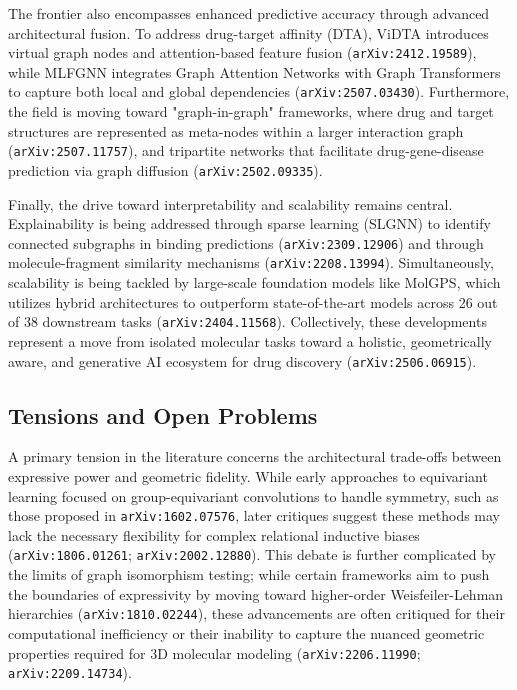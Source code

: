 \documentclass[11pt]{article}
\begin{document}
The frontier also encompasses enhanced predictive accuracy through advanced architectural fusion. To address drug-target affinity (DTA), ViDTA introduces virtual graph nodes and attention-based feature fusion (\texttt{arXiv:2412.19589}), while MLFGNN integrates Graph Attention Networks with Graph Transformers to capture both local and global dependencies (\texttt{arXiv:2507.03430}). Furthermore, the field is moving toward "graph-in-graph" frameworks, where drug and target structures are represented as meta-nodes within a larger interaction graph (\texttt{arXiv:2507.11757}), and tripartite networks that facilitate drug-gene-disease prediction via graph diffusion (\texttt{arXiv:2502.09335}).

Finally, the drive toward interpretability and scalability remains central. Explainability is being addressed through sparse learning (SLGNN) to identify connected subgraphs in binding predictions (\texttt{arXiv:2309.12906}) and through molecule-fragment similarity mechanisms (\texttt{arXiv:2208.13994}). Simultaneously, scalability is being tackled by large-scale foundation models like MolGPS, which utilizes hybrid architectures to outperform state-of-the-art models across 26 out of 38 downstream tasks (\texttt{arXiv:2404.11568}). Collectively, these developments represent a move from isolated molecular tasks toward a holistic, geometrically aware, and generative AI ecosystem for drug discovery (\texttt{arXiv:2506.06915}).

\subsection{Tensions and Open Problems}

A primary tension in the literature concerns the architectural trade-offs between expressive power and geometric fidelity. While early approaches to equivariant learning focused on group-equivariant convolutions to handle symmetry, such as those proposed in \texttt{arXiv:1602.07576}, later critiques suggest these methods may lack the necessary flexibility for complex relational inductive biases (\texttt{arXiv:1806.01261}; \texttt{arXiv:2002.12880}). This debate is further complicated by the limits of graph isomorphism testing; while certain frameworks aim to push the boundaries of expressivity by moving toward higher-order Weisfeiler-Lehman hierarchies (\texttt{arXiv:1810.02244}), these advancements are often critiqued for their computational inefficiency or their inability to capture the nuanced geometric properties required for 3D molecular modeling (\texttt{arXiv:2206.11990}; \texttt{arXiv:2209.14734}).
\end{document}
